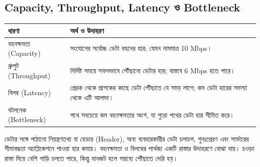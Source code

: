 \subsection{Capacity, Throughput, Latency ও Bottleneck}
\label{ch2:c01-11}
\begin{tabularx}{\linewidth}{|p{.23\linewidth}|X|}
\hline
\textbf{ধারণা} & \textbf{অর্থ ও উদাহরণ}\\\hline
বহনক্ষমতা (Capacity) & সংযোগের সর্বোচ্চ ডেটা বহনের হার; যেমন নামমাত্র 10 Mbps।\\\hline
থ্রুপুট (Throughput) & নির্দিষ্ট সময়ে সফলভাবে পৌঁছানো ডেটার হার; বাস্তবে 6 Mbps হতে পারে।\\\hline
বিলম্ব (Latency) & প্রেরক থেকে প্রাপকের কাছে ডেটা পৌঁছাতে যে সময় লাগে; কম ডেটা হারের সমস্যা থেকে এটি আলাদা।\\\hline
বটলনেক (Bottleneck) & পথে সবচেয়ে কম বহনক্ষমতার অংশ, যা পুরো পথের ডেটা হার সীমিত করে।\\\hline
\end{tabularx}
ডেটার সঙ্গে পাঠানো নিয়ন্ত্রণতথ্য বা হেডার (Header), অন্য ব্যবহারকারীর ডেটা চলাচল, পুনঃপ্রেরণ এবং সার্ভারের সীমাবদ্ধতা অ্যাপ্লিকেশনে পাওয়া হার কমায়। বহনক্ষমতা ও বিলম্বের পার্থক্য একটি রাস্তার উদাহরণে বোঝা যায়। চওড়া রাস্তা দিয়ে বেশি গাড়ি চলতে পারে, কিন্তু যানজট হলে গন্তব্যে পৌঁছাতে দেরি হয়।

